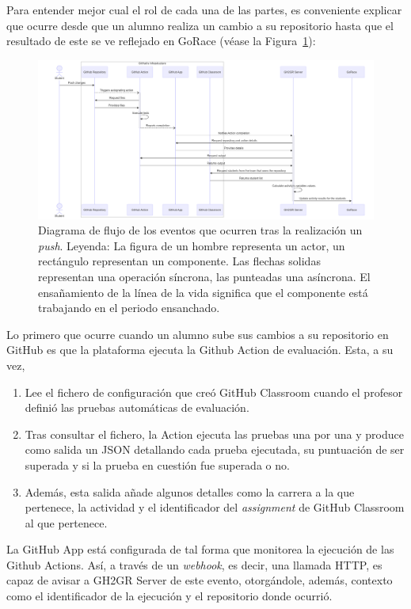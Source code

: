 Para entender mejor cual el rol de cada una de las partes, es conveniente explicar que ocurre desde que un alumno realiza un cambio a su repositorio hasta que el resultado de este se ve reflejado en GoRace (véase la Figura~\ref{fig:enter-label}):

\begin{figure}
    \centering
    \includegraphics[width=\linewidth]{images/flow-after-push.png}
    \caption{Diagrama de flujo de los eventos que ocurren tras la realización un \textit{push}. Leyenda: La figura de un hombre representa un actor, un rectángulo representan un componente. Las flechas solidas representan una operación síncrona, las punteadas una asíncrona. El ensañamiento de la línea de la vida significa que el componente está trabajando en el periodo ensanchado.}
    \label{fig:enter-label}
\end{figure}

Lo primero que ocurre cuando un alumno sube sus cambios a su repositorio en GitHub es que la plataforma ejecuta la Github Action de evaluación. Esta, a su vez, 
\begin{enumerate}
\item Lee el fichero de configuración que creó GitHub Classroom cuando el profesor definió las pruebas automáticas de evaluación. 
\item Tras consultar el fichero, la Action ejecuta las pruebas una por una y produce como salida un \acrshort{JSON} detallando cada prueba ejecutada, su puntuación de ser superada y si la prueba en cuestión fue superada o no. 
\item Además, esta salida añade algunos detalles como la carrera a la que pertenece, la actividad y el identificador del \textit{assignment} de GitHub Classroom al que pertenece.
\end{enumerate}

La GitHub App está configurada de tal forma que monitorea la ejecución de las Github Actions. 
Así, a través de un \textit{webhook}, es decir, una llamada \acrshort{HTTP}, es capaz de avisar a GH2GR Server de este evento, otorgándole, además, contexto como el identificador de la ejecución y el repositorio donde ocurrió. 

